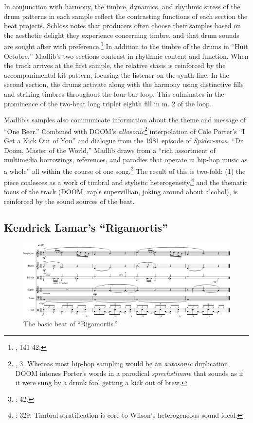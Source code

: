 In conjunction with harmony, the timbre, dynamics, and rhythmic stress of the drum patterns in each sample reflect the contrasting functions of each section the beat projects. Schloss notes that producers often choose their samples based on the aesthetic delight they experience concerning timbre, and that drum sounds are sought after with preference.\footnote{\cite{josephgschlossMakingBeatsArt2004}, 141-42.} In addition to the timbre of the drums in ``Huit Octobre,'' Madlib's two sections contrast in rhythmic content and function. When the track arrives at the first sample, the relative stasis is reinforced by the accompanimental kit pattern, focusing the listener on the synth line. In the second section, the drums activate along with the harmony using distinctive fills and striking timbres throughout the four-bar loop. This culminates in the prominence of the two-beat long triplet eighth fill in m. 2 of the loop.

Madlib's samples also communicate information about the theme and message of ``One Beer.'' Combined with DOOM's \emph{allosonic}\footnote{\cite{justinawilliamsRhyminStealinMusical2013}, 3. Whereas most hip-hop sampling would be an \emph{autosonic} duplication, DOOM intones Porter's words in a parodical \textit{sprechstimme} that sounds as if it were sung by a drunk fool getting a kick out of brew.} interpolation of Cole Porter's ``I Get a Kick Out of You'' and dialogue from the 1981 episode of \textit{Spider-man}, ``Dr. Doom, Master of the World,'' Madlib draws from a ``rich assortment of multimedia borrowings, references, and parodies that operate in hip-hop music as a whole'' all within the course of one song.\footnote{\cite{joannademersSampling1970sHipHop2003}: 42.} The result of this is two-fold: (1) the piece coalesces as a work of timbral and stylistic heterogeneity,\footnote{\cite{ollywilsonHeterogeneousSoundIdeal1992}: 329. Timbral stratification is core to Wilson's heterogeneous sound ideal.} and the thematic focus of the track (DOOM, rap's supervillian, joking around about alcohol), is reinforced by the sound sources of the beat.

\subsection*{\centering Kendrick Lamar's ``Rigamortis''}

\begin{figure}[h]
    \centering
    \includegraphics[width=\textwidth]{images/figures/chp 02/Figure-02.3-Rigamortis-BB.pdf}
    \caption{The basic beat of ``Rigamortis.''}
    \label{fig:2.1}
\end{figure}

